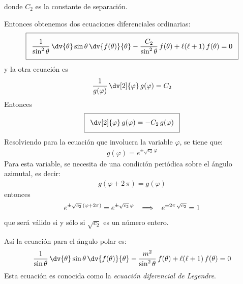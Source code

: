 donde $C_{2}$ es la constante de separación.
\par
Entonces obtenemos dos ecuaciones diferenciales ordinarias:
\begin{align*}
\addtolength{\fboxsep}{5pt}\boxed{
\dfrac{1}{\sin^{2} \theta} \, \dv{\theta} \sin \theta \, \dv{f(\theta)}{\theta} - \dfrac{C_{2}}{\sin^{2} \theta} \, f(\theta) + \ell (\ell + 1) \, f(\theta) = 0}
\end{align*}
y la otra ecuación es
\begin{align*}
\dfrac{1}{g(\varphi)} \, \dv[2]{\varphi} \, g(\varphi) = C_{2} 
\end{align*}
Entonces
\begin{align*}
\addtolength{\fboxsep}{5pt}\boxed{
\dv[2]{\varphi} \, g(\varphi) = - C_{2} \, g(\varphi)}
\end{align*}
Resolviendo para la ecuación que involucra la variable $\varphi$, se tiene que:
\begin{align*}
g(\varphi) = e^{\pm \sqrt{c_{2}} \, \varphi}
\end{align*}
Para esta variable, se necesita de una condición periódica sobre el ángulo azimutal, es decir:
\begin{align*}
g(\varphi +  2 \, \pi) = g (\varphi)
\end{align*}
entonces
\begin{align*}
e^{\pm \sqrt{c_{2}} \, (\varphi + 2 \pi)} = e^{\pm \sqrt{c_{2}} \, \varphi} \hspace{0.3cm} \Longrightarrow \hspace{0.3cm} e^{\pm 2 \pi \, \sqrt{c_{2}}} = 1
\end{align*}
que será válido si y sólo si $\sqrt{c_{2}}$ es un número entero.

Así la ecuación para el ángulo polar es:
\begin{align*}
\dfrac{1}{\sin \theta} \, \dv{\theta} \sin \theta \, \dv{f(\theta)}{\theta} - \dfrac{m^{2}}{\sin^{2} \theta} \, f(\theta) + \ell (\ell + 1) \, f(\theta) = 0
\end{align*}
Esta ecuación es conocida como la \emph{ecuación diferencial de Legendre}.

